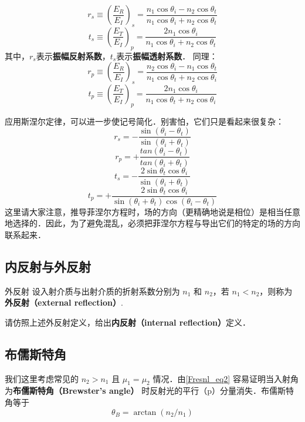 \begin{equation}\label{Fresnl_eq3}
r_s \equiv \left(\frac{E_R}{E_I}\right)_s = \frac{n_1\cos{\theta_i} - n_2\cos\theta_t}{n_1\cos\theta_i + n_2\cos\theta_t}
\end{equation}
\begin{equation}\label{Fresnl_eq4}
t_s \equiv \left(\frac{E_T}{E_I}\right)_p =  \frac{2 n_1\cos\theta_i}{n_1\cos\theta_i + n_2\cos\theta_t}
\end{equation}
其中，$r_s$表示\textbf{振幅反射系数}，$t_s$表示\textbf{振幅透射系数}．
同理：
\begin{equation}\label{Fresnl_eq5}
r_p \equiv \left(\frac{E_R}{E_I}\right)_s = \frac{n_2\cos{\theta_i} - n_1\cos\theta_t}{n_1\cos\theta_t + n_2\cos\theta_i}
\end{equation}
\begin{equation}\label{Fresnl_eq6}
t_p \equiv \left(\frac{E_T}{E_I}\right)_p =  \frac{2 n_1\cos\theta_i}{n_1\cos\theta_t + n_2\cos\theta_i}
\end{equation}

应用斯涅尔定律，可以进一步使记号简化．别害怕，它们只是看起来很复杂：
\begin{equation}\label{Fresnl_eq7}
r_s = -\frac{\sin(\theta_i - \theta_t)}{\sin(\theta_i + \theta_t)}
\end{equation}
\begin{equation}\label{Fresnl_eq8}
r_p = +\frac{tan(\theta_i - \theta_t)}{tan(\theta_i + \theta_t)}
\end{equation}
\begin{equation}%
t_s = -\frac{2\sin\theta_t\cos\theta_i}{\sin(\theta_i + \theta_t)}
\end{equation}
\begin{equation}%
t_p = +\frac{2\sin\theta_t\cos\theta_i}{\sin(\theta_i + \theta_t)\cos(\theta_i - \theta_t)}
\end{equation}
这里请大家注意，推导菲涅尔方程时，场的方向（更精确地说是相位）是相当任意地选择的．因此，为了避免混乱，必须把菲涅尔方程与导出它们的特定的场的方向联系起来．

\subsection{内反射与外反射}
\begin{definition}{外反射}
设入射介质与出射介质的折射系数分别为 $n_1$ 和 $n_2$，若 $n_1<n_2$，则称为\textbf{外反射（external reflection）}.
\end{definition}
\begin{exercise}{}
请仿照上述外反射定义，给出\textbf{内反射（internal reflection）}定义．
\end{exercise}

\subsection{布儒斯特角}
我们这里考虑常见的 $n_2>n_1$ 且 $\mu_1 = \mu_2$ 情况．由\autoref{Fresnl_eq2} 容易证明当入射角为\textbf{布儒斯特角（Brewster's angle）} 时反射光的平行（p）分量消失．布儒斯特角等于
\begin{equation}
\theta_B = \arctan (n_2/n_1)
\end{equation}
